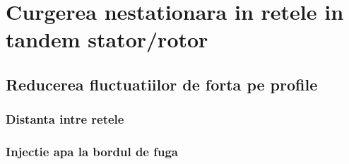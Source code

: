 \chapter{Curgerea nestationara in retele in tandem stator/rotor}\label{chapter:curgerea}

\section{Reducerea fluctuatiilor de forta pe profile}

\subsection{Distanta intre retele}

\subsection{Injectie apa la bordul de fuga}